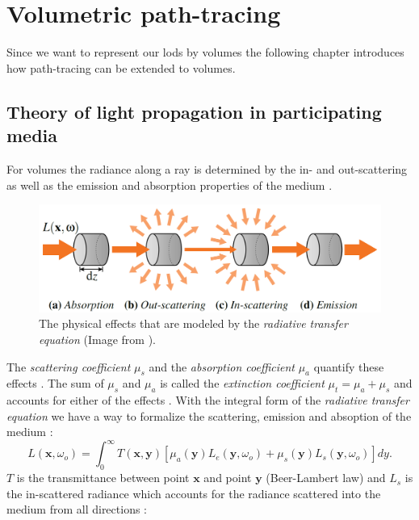 \section{Volumetric path-tracing}
Since we want to represent our \acsp{lod} by volumes the following chapter introduces how path-tracing can be extended to volumes.
\subsection{Theory of light propagation in participating media}
\label{subsec:theory_of_light_propagation_in_participating_media}
For volumes the radiance along a ray is determined by the in- and out-scattering as well as the emission and absorption properties of the medium \cite[p. 3]{novak_overview}.
\begin{figure}[!ht]
    \centering
    \includegraphics[width=0.8\linewidth]{img/novak_volume_effects.png}
    \caption{The physical effects that are modeled by the \textit{radiative transfer equation} (Image from \cite[p. 2]{novak_overview}).}
    \label{fig:novak_volume_effects}
\end{figure}
The \textit{scattering coefficient} $\mu_s$ and the \textit{absorption coefficient} $\mu_a$ quantify these effects \cite[p. 2]{novak_overview}.
The sum of $\mu_s$ and $\mu_a$ is called the \textit{extinction coefficient} $\mu_t=\mu_a + \mu_s$ and accounts for either of the effects \cite[p. 2]{novak_overview}.
With the integral form of the \textit{radiative transfer equation} we have a way to formalize the scattering, emission and absoption of the medium \cite[p. 3]{novak_overview}:
\begin{equation}
    \label{eq:radiative_transfer}
    L(\boldsymbol{x}, \omega_o) = \int_0^\infty T(\boldsymbol{x}, \boldsymbol{y})[\mu_a(\boldsymbol{y})L_e(\boldsymbol{y}, \omega_o) + \mu_s(\boldsymbol{y})L_s(\boldsymbol{y}, \omega_o)]dy.
\end{equation}
$T$ is the transmittance between point $\boldsymbol{x}$ and point $\boldsymbol{y}$ (Beer-Lambert law) and $L_s$ is the in-scattered radiance which accounts for the radiance scattered into the medium from all directions \cite[p. 3]{novak_overview}:
